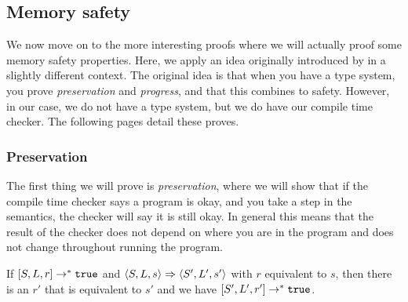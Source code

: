 \subsection{Memory safety}
We now move on to the more interesting proofs where we will actually proof some memory safety properties. Here, we apply an idea originally introduced by \cite{wright1994syntactic} in a slightly different context. The original idea is that when you have a type system, you prove \emph{preservation} and \emph{progress}, and that this combines to safety. However, in our case, we do not have a type system, but we do have our compile time checker. The following pages detail these proves.

\subsubsection*{Preservation}
The first thing we will prove is \emph{preservation}, where we will show that if the compile time checker says a program is okay, and you take a step in the semantics, the checker will say it is still okay. In general this means that the result of the checker does not depend on where you are in the program and does not change throughout running the program. 

\begin{theorem}
\label{preservation}
If $[ S, L, r ] \to ^* \texttt{true}$ and $\langle S, L, s \rangle \Rightarrow \langle S', L', s' \rangle$ with $r$ equivalent to $s$, then there is an $r'$ that is equivalent to $s'$ and we have $[ S', L', r' ] \to ^* \texttt{true}$.
\end{theorem}

